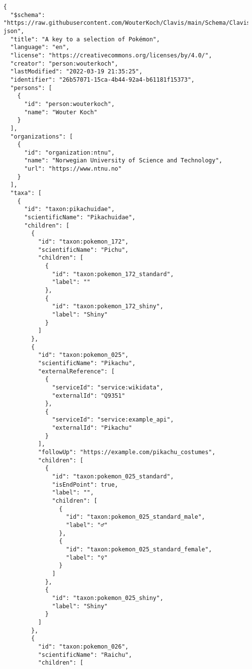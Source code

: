 \documentclass[10pt,letterpaper]{article}
\begin{document}
\vspace*{0.2in}

\begin{flushleft}
{\Large
\textbf{}}
\newline
\end{flushleft}
\linenumbers
\begin{verbatim}
{
  "$schema":
"https://raw.githubusercontent.com/WouterKoch/Clavis/main/Schema/Clavis.
json",
  "title": "A key to a selection of Pokémon",
  "language": "en",
  "license": "https://creativecommons.org/licenses/by/4.0/",
  "creator": "person:wouterkoch",
  "lastModified": "2022-03-19 21:35:25",
  "identifier": "26b57071-15ca-4b44-92a4-b61181f15373",
  "persons": [
    {
      "id": "person:wouterkoch",
      "name": "Wouter Koch"
    }
  ],
  "organizations": [
    {
      "id": "organization:ntnu",
      "name": "Norwegian University of Science and Technology",
      "url": "https://www.ntnu.no"
    }
  ],
  "taxa": [
    {
      "id": "taxon:pikachuidae",
      "scientificName": "Pikachuidae",
      "children": [
        {
          "id": "taxon:pokemon_172",
          "scientificName": "Pichu",
          "children": [
            {
              "id": "taxon:pokemon_172_standard",
              "label": ""
            },
            {
              "id": "taxon:pokemon_172_shiny",
              "label": "Shiny"
            }
          ]
        },
        {
          "id": "taxon:pokemon_025",
          "scientificName": "Pikachu",
          "externalReference": [
            {
              "serviceId": "service:wikidata",
              "externalId": "Q9351"
            },
            {
              "serviceId": "service:example_api",
              "externalId": "Pikachu"
            }
          ],
          "followUp": "https://example.com/pikachu_costumes",
          "children": [
            {
              "id": "taxon:pokemon_025_standard",
              "isEndPoint": true,
              "label": "",
              "children": [
                {
                  "id": "taxon:pokemon_025_standard_male",
                  "label": "♂"
                },
                {
                  "id": "taxon:pokemon_025_standard_female",
                  "label": "♀"
                }
              ]
            },
            {
              "id": "taxon:pokemon_025_shiny",
              "label": "Shiny"
            }
          ]
        },
        {
          "id": "taxon:pokemon_026",
          "scientificName": "Raichu",
          "children": [

\end{verbatim}
\end{document}
